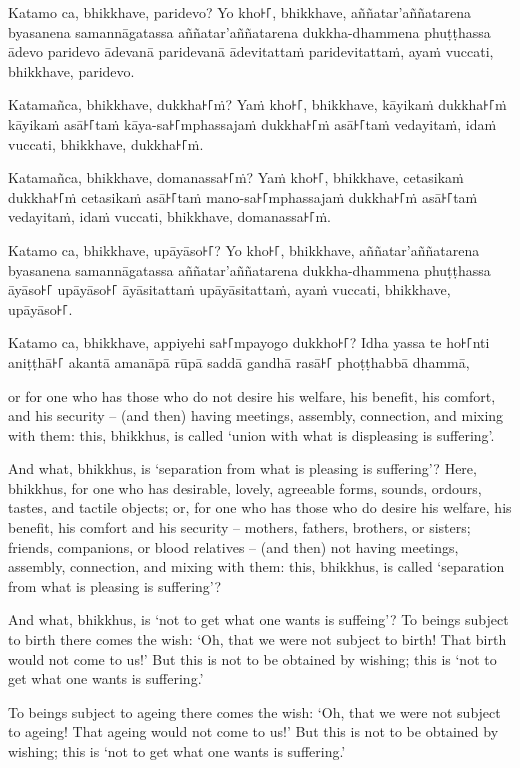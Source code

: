 Katamo ca, bhikkhave, paridevo? Yo kho꜔꜒, bhikkhave, aññatar'aññatarena
byasanena samannāgatassa aññatar'aññatarena dukkha-dhammena phuṭṭhassa
ādevo paridevo ādevanā paridevanā ādevitattaṁ paridevitattaṁ, ayaṁ
vuccati, bhikkhave, paridevo.

Katamañca, bhikkhave, dukkha꜔꜒ṁ? Yaṁ kho꜔꜒, bhikkhave, kāyikaṁ dukkha꜔꜒ṁ kāyikaṁ
asā꜔꜒taṁ kāya-sa꜔꜒mphassajaṁ dukkha꜔꜒ṁ asā꜔꜒taṁ vedayitaṁ, idaṁ vuccati, bhikkhave,
dukkha꜔꜒ṁ.

Katamañca, bhikkhave, domanassa꜔꜒ṁ? Yaṁ kho꜔꜒, bhikkhave, cetasikaṁ dukkha꜔꜒ṁ
cetasikaṁ asā꜔꜒taṁ mano-sa꜔꜒mphassajaṁ dukkha꜔꜒ṁ asā꜔꜒taṁ vedayitaṁ, idaṁ vuccati,
bhikkhave, domanassa꜔꜒ṁ.

Katamo ca, bhikkhave, upāyāso꜔꜒? Yo kho꜔꜒, bhikkhave, aññatar'aññatarena byasanena
samannāgatassa aññatar'aññatarena dukkha-dhammena phuṭṭhassa āyāso꜔꜒ upāyāso꜔꜒
āyāsitattaṁ upāyāsitattaṁ, ayaṁ vuccati, bhikkhave, upāyāso꜔꜒.

Katamo ca, bhikkhave, appiyehi sa꜔꜒mpayogo dukkho꜔꜒? Idha yassa te ho꜔꜒nti aniṭṭhā꜔꜒
akantā amanāpā rūpā saddā gandhā rasā꜔꜒ phoṭṭhabbā dhammā,

\englishPage

or for one who has those who do not desire his welfare, his benefit, his
comfort, and his security -- (and then) having meetings, assembly, connection,
and mixing with them: this, bhikkhus, is called `union with what is displeasing
is suffering'.

And what, bhikkhus, is `separation from what is pleasing is suffering'? Here,
bhikkhus, for one who has desirable, lovely, agreeable forms, sounds, ordours,
tastes, and tactile objects; or, for one who has those who do desire his
welfare, his benefit, his comfort and his security -- mothers, fathers,
brothers, or sisters; friends, companions, or blood relatives -- (and then) not
having meetings, assembly, connection, and mixing with them: this, bhikkhus, is
called `separation from what is pleasing is suffering'?

And what, bhikkhus, is `not to get what one wants is suffeing'? To beings
subject to birth there comes the wish: `Oh, that we were not subject to birth!
That birth would not come to us!' But this is not to be obtained by wishing;
this is `not to get what one wants is suffering.'

To beings subject to ageing there comes the wish: `Oh, that we were not subject
to ageing! That ageing would not come to us!' But this is not to be obtained by
wishing; this is `not to get what one wants is suffering.'


